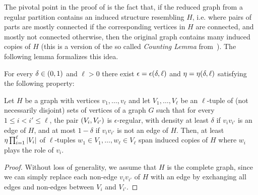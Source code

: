         The pivotal point in the proof of  is the fact that, if the
        reduced graph  from a regular partition contains an induced structure resembling $H$, i.e. where pairs of parts are
        mostly connected if the corresponding vertices in $H$ are connected, and mostly not connected otherwise,
        then the original graph contains many induced copies of $H$ (this is a version of the so called \emph{Counting Lemma}
        from~\cite{the_regulariy_lemma_and_its_applications_in_graph_theory}).
        The following lemma formalizes this idea.

        \begin{lemma} \label{lem:H_like_partition_implies_H_abundance}
            For every $\delta \in ( 0, 1 )$ and $\ell > 0$ there exist $\epsilon = \epsilon ( \delta, \ell )$ and
            $\eta = \eta ( \delta, \ell )$ satisfying the following property:

            Let $H$ be a graph with vertices $v_1, \dots,v_\ell$ and let $V_1, \dots, V_\ell$ be an $\ell$-tuple of (not necessarily disjoint)
            sets of vertices of a graph $G$ such that for every $1 \leq i < i' \leq \ell$, the pair $( V_i, V_{i'} )$
            is $\epsilon$-regular, with density at least $\delta$ if $v_i v_{i'}$ is an edge of $H$, and at most $1 - \delta$
            if $v_i v_{i'}$ is not an edge of $H$.
            Then, at least $\eta \prod_{i=1}^\ell | V_i |$ of $\ell$-tuples $w_1 \in V_1, \dots, w_\ell \in V_\ell$
            span induced copies of $H$ where $w_i$ plays the role of $v_i$.
            \begin{proof}
                Without loss of generality, we assume that $H$ is the complete graph, since we can simply replace each non-edge
                $v_i v_{i'}$ of $H$ with an edge by exchanging all edges and non-edges between $V_i$ and $V_{i'}$.


\end{proof}
\end{lemma}
